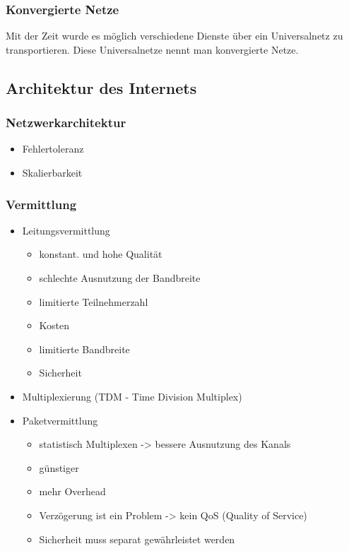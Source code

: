 \documentclass[11pt,a4paper]{article}
\begin{document}
\subsubsection{Konvergierte Netze}
Mit der Zeit wurde es möglich verschiedene Dienste über ein Universalnetz zu transportieren. Diese Universalnetze nennt man konvergierte Netze.

\subsection{Architektur des Internets}
\subsubsection{Netzwerkarchitektur}
\begin{itemize}
\item Fehlertoleranz
\item Skalierbarkeit
\end{itemize}
\subsubsection{Vermittlung}
\begin{itemize}
\item Leitungsvermittlung
    \begin{itemize}
    \item konstant. und hohe Qualität
    \item schlechte Ausnutzung der Bandbreite
    \item limitierte Teilnehmerzahl
    \item Kosten
    \item limitierte Bandbreite
    \item Sicherheit
    \end{itemize}
\item Multiplexierung (TDM - Time Division Multiplex)
\item Paketvermittlung
    \begin{itemize}
    \item statistisch Multiplexen -> bessere Ausnutzung des Kanals
    \item günstiger
    \item mehr Overhead
    \item Verzögerung ist ein Problem -> kein QoS (Quality of Service)
    \item Sicherheit muss separat gewährleistet werden
    \end{itemize}
\end{itemize}
\end{document}
